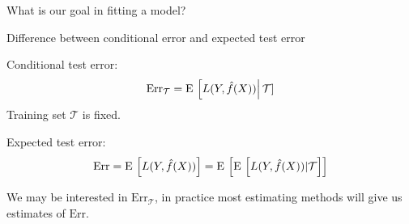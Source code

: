 \documentclass[xcolor={table}, handout]{beamer}
\begin{document}

\begin{frame}{What is our goal in fitting a model?}

\begin{wideitemize}
\item Difference between conditional error and expected test error\pause
\begin{wideitemize}
\item Conditional test error:
\[
\textrm{Err}_{\mathcal{T}} = {\textrm E}\, \left[ L(Y, \hat{f}(X))\right \rvert \mathcal{T}]
\]
Training set $\mathcal{T}$ is fixed. \pause

\item Expected test error:
\[
\textrm{Err} = {\textrm E}\, \left[ L(Y, \hat{f}(X))\right] ={\textrm E}\, \left[  {\textrm E}\, \left[ L(Y, \hat{f}(X)) \rvert \mathcal{T}\right] \right]
\]
\end{wideitemize}\pause
\item We may be interested in $\textrm{Err}_{\mathcal{T}}$, in practice most estimating methods will give us estimates of $\textrm{Err}$. 
\end{wideitemize}

\end{frame}


\end{document}
